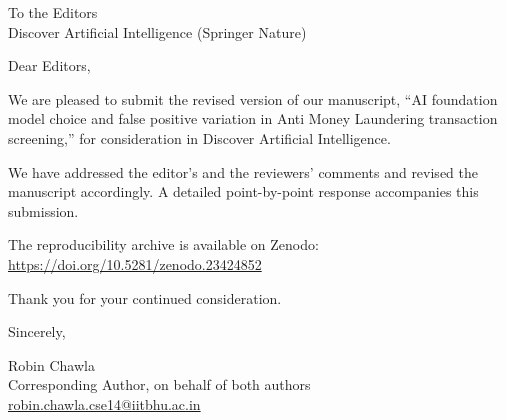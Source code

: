 \documentclass[12pt]{article}
\begin{document}
To the Editors\\
Discover Artificial Intelligence (Springer Nature)

Dear Editors,

We are pleased to submit the revised version of our manuscript, ``AI foundation model choice
and false positive variation in Anti Money Laundering transaction screening,'' for
consideration in Discover Artificial Intelligence.

We have addressed the editor's and the reviewers' comments and revised the manuscript
accordingly. A detailed point-by-point response accompanies this submission.

{\raggedright The reproducibility archive is available on Zenodo:\\
\url{https://doi.org/10.5281/zenodo.23424852}\par}

Thank you for your continued consideration.

\vspace{6pt}
Sincerely,

Robin Chawla\\
Corresponding Author, on behalf of both authors\\
\href{mailto:robin.chawla.cse14@iitbhu.ac.in}{robin.chawla.cse14@iitbhu.ac.in}
\end{document}
